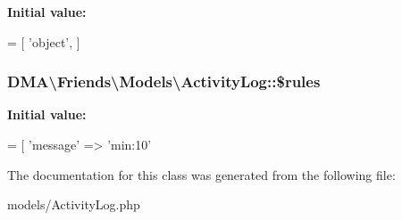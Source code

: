 {\bfseries Initial value\-:}
\begin{DoxyCode}
= [
        \textcolor{stringliteral}{'object'},
    ]
\end{DoxyCode}
\hypertarget{classDMA_1_1Friends_1_1Models_1_1ActivityLog_a0b8a60f69fd1fef78f71d538ca6f12e0}{
\subsubsection[{\$rules}]{\setlength{\rightskip}{0pt plus 5cm}D\-M\-A\textbackslash{}\-Friends\textbackslash{}\-Models\textbackslash{}\-Activity\-Log\-::\$rules\hspace{0.3cm}{\ttfamily [protected]}}}\label{classDMA_1_1Friends_1_1Models_1_1ActivityLog_a0b8a60f69fd1fef78f71d538ca6f12e0}
{\bfseries Initial value\-:}
\begin{DoxyCode}
= [
        \textcolor{stringliteral}{'message'}       => \textcolor{stringliteral}{'min:10'}
\end{DoxyCode}


The documentation for this class was generated from the following file\-:\begin{DoxyCompactItemize}
\item 
models/Activity\-Log.\-php\end{DoxyCompactItemize}
